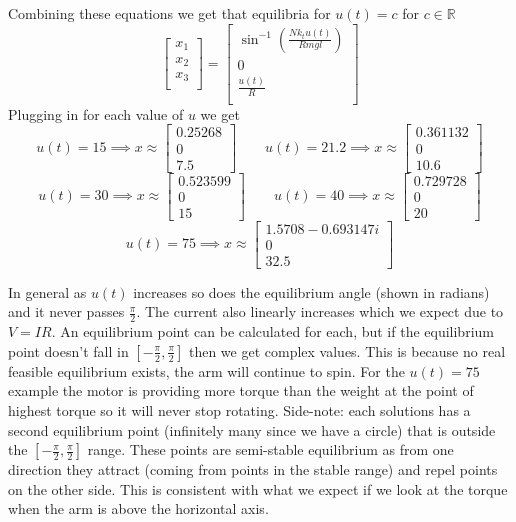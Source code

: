 \documentclass{article}
\begin{document}
\begin{enumerate}[a)]
Combining these equations we get that equilibria for $u(t) = c$ for $c\in \mathbb{R}$
$$
\begin{bmatrix}
x_1 \\
x_2 \\
x_3 \\
\end{bmatrix}
=
\begin{bmatrix}
\sin^{-1}(\frac{Nk_tu(t)}{Rmgl}) \\
0 \\
\frac{u(t)}{R}\\
\end{bmatrix}
$$
Plugging in for each value of $u$ we get
$$
u(t)=15 \implies x \approx \begin{bmatrix} 0.25268 \\ 0 \\ 7.5 \end{bmatrix}
\qquad
u(t)=21.2 \implies x \approx \begin{bmatrix} 0.361132 \\ 0 \\ 10.6 \end{bmatrix}
$$
$$
u(t)=30 \implies x \approx \begin{bmatrix} 0.523599 \\ 0 \\ 15 \end{bmatrix}
\qquad
u(t)=40 \implies x \approx \begin{bmatrix} 0.729728 \\ 0 \\ 20 \end{bmatrix}
$$
$$
u(t)=75 \implies x \approx \begin{bmatrix} 1.5708 - 0.693147i \\ 0 \\ 32.5 \end{bmatrix}
$$

In general as $u(t)$ increases so does the equilibrium angle (shown in radians) and it never passes $\frac{\pi}{2}$.
The current also linearly increases which we expect due to $V=IR$.
An equilibrium point can be calculated for each, but if the equilibrium point doesn't fall in $[-\frac{\pi}{2}, \frac{\pi}{2}]$ then we get complex values.
This is because no real feasible equilibrium exists, the arm will continue to spin.
For the $u(t)=75$ example the motor is providing more torque than the weight at the point of highest torque so it will never stop rotating.
\newline
Side-note: each solutions has a second equilibrium point (infinitely many since we have a circle) that is outside the $[-\frac{\pi}{2}, \frac{\pi}{2}]$ range.
These points are semi-stable equilibrium as from one direction they attract (coming from points in the stable range) and repel points on the other side.
This is consistent with what we expect if we look at the torque  when the arm is above the horizontal axis.


\end{enumerate}
\end{document}
